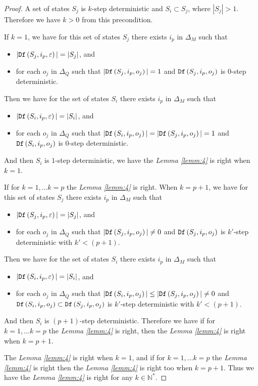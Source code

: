 \begin{proof}
A set of states $S_j$ is $k$-step deterministic and $S_i\subset S_j$, where $|S_j|>1$. Therefore we have $k>0$ from this precondition.

If $k=1$, we have for this set of states $S_j$ there exists $i_p$ in $\Delta_M$ such that
 \begin{itemize}
 \item  $|{\tt Df}\left(S_j,i_p,\varepsilon\right)|=|S_j|$, and 
 \item  for each $o_j$ in $\Delta_Q$ such that $|{\tt Df}\left(S_j,i_p,o_j\right)|=1$ and ${\tt Df}\left(S_j,i_p,o_j\right)$ is $0$-step deterministic.
 \end{itemize}
 Then we have for the set of states $S_i$ there exists $i_p$ in $\Delta_M$ such that
 \begin{itemize}
 \item  $|{\tt Df}\left(S_i,i_p,\varepsilon\right)|=|S_i|$, and 
 \item  for each $o_j$ in $\Delta_Q$ such that $|{\tt Df}\left(S_i,i_p,o_j\right)|=|{\tt Df}\left(S_j,i_p,o_j\right)|=1$ and ${\tt Df}\left(S_i,i_p,o_j\right)$ is $0$-step deterministic.
 \end{itemize} And then $S_i$ is $1$-step deterministic, we have the {\em Lemma \ref{lemm:4}} is right when $k=1$.
 
 If for $k=1,\ldots k=p$ the {\em Lemma \ref{lemm:4}} is right. When $k=p+1$, we have  for this set of states $S_j$ there exists $i_p$ in $\Delta_M$ such that
 \begin{itemize}
 \item  $|{\tt Df}\left(S_j,i_p,\varepsilon\right)|=|S_j|$, and 
 \item  for each $o_j$ in $\Delta_Q$ such that $|{\tt Df}\left(S_j,i_p,o_j\right)|\neq 0$ and ${\tt Df}\left(S_j,i_p,o_j\right)$ is $k'$-step deterministic with  ${k'}<(p+1)$.
 \end{itemize}
 Then we have for the set of states $S_i$ there exists $i_p$ in $\Delta_M$ such that
 \begin{itemize}
 \item  $|{\tt Df}\left(S_i,i_p,\varepsilon\right)|=|S_i|$, and 
 \item  for each $o_j$ in $\Delta_Q$ such that $|{\tt Df}\left(S_i,i_p,o_j\right)| \le |{\tt Df}\left(S_j,i_p,o_j\right)|\neq 0$ and ${\tt Df}\left(S_i,i_p,o_j\right)\subset {\tt Df}\left(S_j,i_p,o_j\right)$ is  $k'$-step deterministic with  ${k'}<(p+1)$.
 \end{itemize}  And then $S_i$ is $(p+1)$-step deterministic. Therefore we have if for $k=1,\ldots k=p$ the {\em Lemma \ref{lemm:4}} is right, then the {\em Lemma \ref{lemm:4}} is right when $k=p+1$. 

The {\em Lemma \ref{lemm:4}} is right when $k=1$, and if for $k=1,\ldots k=p$ the {\em Lemma \ref{lemm:4}} is right then the {\em Lemma \ref{lemm:4}} is right too when $k=p+1$. Thus we have the {\em Lemma \ref{lemm:4}} is right for any $k\in \mathbb{N}^*$.
 
\end{proof}

